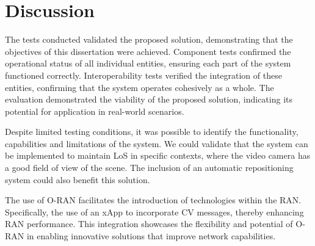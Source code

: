 

\section{Discussion}\label{sec:discuss}
The tests conducted validated the proposed solution, demonstrating that the objectives of this dissertation were achieved.
Component tests confirmed the operational status of all individual entities, ensuring each part of the system functioned correctly.
Interoperability tests verified the integration of these entities, confirming that the system operates cohesively as a whole.
The evaluation demonstrated the viability of the proposed solution, indicating its potential for application in real-world scenarios.

Despite limited testing conditions, it was possible to identify the functionality, capabilities and limitations of the system.
We could validate that the system can be implemented to maintain LoS in specific contexts, where the video camera has a good field of view of the scene.
The inclusion of an automatic repositioning system could also benefit this solution.

The use of O-RAN facilitates the introduction of technologies within the RAN\@.
Specifically, the use of an xApp to incorporate CV messages, thereby enhancing RAN performance.
This integration showcases the flexibility and potential of O-RAN in enabling innovative solutions that improve network capabilities.
